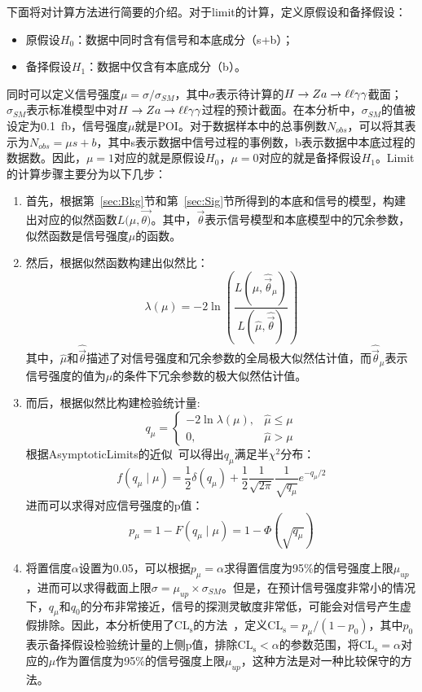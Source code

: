 下面将对计算方法进行简要的介绍。对于limit的计算，定义原假设和备择假设：
\begin{itemize}
    \item 原假设$H_0$：数据中同时含有信号和本底成分（s+b）；
    \item 备择假设$H_1$：数据中仅含有本底成分（b）。
\end{itemize}
同时可以定义信号强度$\mu=\sigma/\sigma_{SM}$，其中$\sigma$表示待计算的$H\to Za\to\ell\ell\gamma\gamma$截面；$\sigma_{SM}$表示标准模型中对$H\to Za\to\ell\ell\gamma\gamma$过程的预计截面。在本分析中，$\sigma_{SM}$的值被设定为0.1~\si{fb}，信号强度$\mu$就是POI。对于数据样本中的总事例数$N_{obs}$，可以将其表示为$N_{obs} = \mu s + b$，其中s表示数据中信号过程的事例数，b表示数据中本底过程的数据数。因此，$\mu=1$对应的就是原假设$H_0$，$\mu=0$对应的就是备择假设$H_1$。Limit的计算步骤主要分为以下几步：
\begin{enumerate}
    \item 首先，根据第~\ref{sec:Bkg}节和第~\ref{sec:Sig}节所得到的本底和信号的模型，构建出对应的似然函数$L(\mu,\vec{\theta)}$。其中，$\vec{\theta}$表示信号模型和本底模型中的冗余参数，似然函数是信号强度$\mu$的函数。
    \item 然后，根据似然函数构建出似然比：
    \begin{equation}
    \lambda(\mu)=-2 \ln \left(\frac{L(\mu, \hat{\vec{\theta}}_{\mu})}{L(\hat{\mu}, \hat{\vec{\theta}})}\right)
    \end{equation}
    其中，$\hat{\mu}$和$\hat{\vec{\theta}}$描述了对信号强度和冗余参数的全局极大似然估计值，而$\hat{\vec{\theta}}_{\mu}$表示信号强度的值为$\mu$的条件下冗余参数的极大似然估计值。
    \item 而后，根据似然比构建检验统计量:
    \begin{equation}
    q_{\mu}=\left\{\begin{array}{ll}
    -2 \ln \lambda(\mu), & \hat{\mu} \leq \mu \\
    0, & \hat{\mu}>\mu
    \end{array}\right.
    \end{equation}
    根据AsymptoticLimits的近似~\cite{cowan2011asymptotic}可以得出$q_{\mu}$满足半$\chi^{2}$分布：
    \begin{equation}
    f\left(q_{\mu} \mid \mu\right)=\frac{1}{2} \delta\left(q_{\mu}\right)+\frac{1}{2} \frac{1}{\sqrt{2 \pi}} \frac{1}{\sqrt{q_{\mu}}} e^{-q_{\mu} / 2}
    \end{equation}
    进而可以求得对应信号强度的p值：
    \begin{equation}
    p_{\mu} = 1 - F(q_{\mu} \mid \mu) = 1 - \Phi(\sqrt{q_{\mu}})
    \end{equation}
    \item 将置信度$\alpha$设置为0.05，可以根据$p_{\mu}=\alpha$求得置信度为95\%的信号强度上限$\mu_{up}$，进而可以求得截面上限$\sigma = \mu_{up}\times\sigma_{SM}$。但是，在预计信号强度非常小的情况下，$q_{\mu}$和$q_{0}$的分布非常接近，信号的探测灵敏度非常低，可能会对信号产生虚假排除。因此，本分析使用了$\mathrm{CL_{s}}$的方法~\cite{cite:l1,cite:l2,cite:l3}，定义$\mathrm{CL_{s}}=p_{\mu}/(1-p_{0})$，其中$p_{0}$表示备择假设检验统计量的上侧p值，排除$\mathrm{CL_{s}}<\alpha$的参数范围，将$\mathrm{CL_{s}}=\alpha$对应的$\mu$作为置信度为95\%的信号强度上限$\mu_{up}$，这种方法是对一种比较保守的方法。
\end{enumerate}

